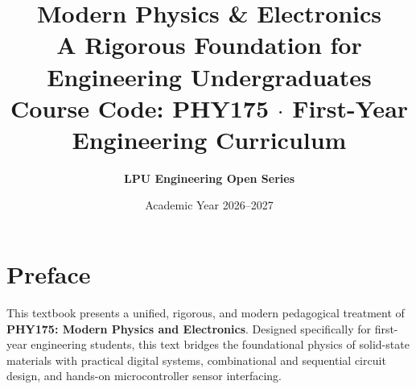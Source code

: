 \documentclass[11pt,a4paper,twoside,openright]{book}
\title{\Huge\bfseries\color{brandnavy} Modern Physics \& Electronics\\[0.5em]
\Large\color{brandblue} A Rigorous Foundation for Engineering Undergraduates\\[1em]
\normalsize\color{brandslate} Course Code: PHY175 $\cdot$ First-Year Engineering Curriculum}
\author{\textbf{LPU Engineering Open Series}}
\date{Academic Year 2026--2027}
\begin{document}
\frontmatter
\maketitle

\chapter*{Preface}
This textbook presents a unified, rigorous, and modern pedagogical treatment of \textbf{PHY175: Modern Physics and Electronics}. Designed specifically for first-year engineering students, this text bridges the foundational physics of solid-state materials with practical digital systems, combinational and sequential circuit design, and hands-on microcontroller sensor interfacing.

\tableofcontents

\mainmatter







\end{document}
